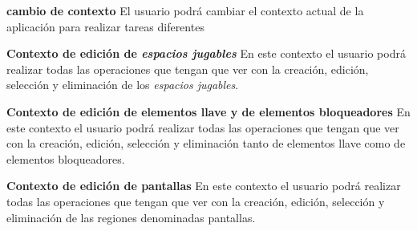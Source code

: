 	\item \textbf{cambio de contexto}\newline
		El usuario podrá cambiar el contexto actual de la aplicación para realizar tareas diferentes
		\begin{functional}
			\item \textbf{Contexto de edición de \textit{espacios jugables}}\newline
				En este contexto el usuario podrá realizar todas las operaciones que tengan que ver con la creación, edición, selección y eliminación de los \textit{espacios jugables}.
			\item \textbf{Contexto de edición de elementos llave y de elementos bloqueadores}\newline
				En este contexto el usuario podrá realizar todas las operaciones que tengan que ver con la creación, edición, selección y eliminación tanto de elementos llave como de elementos bloqueadores.
			\item \textbf{Contexto de edición de pantallas}\newline
				En este contexto el usuario podrá realizar todas las operaciones que tengan que ver con la creación, edición, selección y eliminación de las regiones denominadas pantallas.
		\end{functional}
